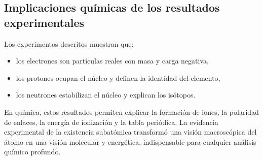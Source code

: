 \documentclass{article}
\begin{document}
    \subsection{Implicaciones químicas de los resultados experimentales}

    Los experimentos descritos muestran que:
    \begin{itemize}
        \item los electrones son partículas reales con masa y carga negativa,
        \item los protones ocupan el núcleo y definen la identidad del elemento,
        \item los neutrones estabilizan el núcleo y explican los isótopos.
    \end{itemize}

    En química, estos resultados permiten explicar la formación de iones, la polaridad de enlaces, la energía de ionización y la tabla periódica. La evidencia experimental de la existencia subatómica transformó una visión macroscópica del átomo en una visión molecular y energética, indispensable para cualquier análisis químico profundo.
\end{document}
